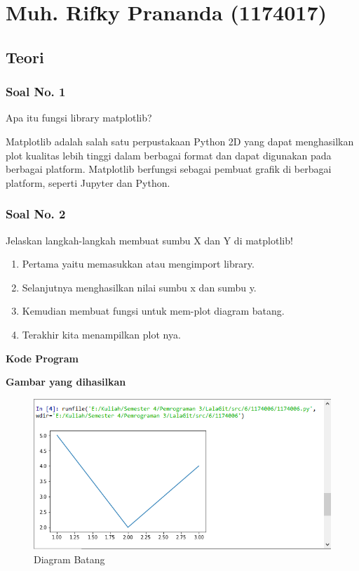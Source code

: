 \section{Muh. Rifky Prananda (1174017)}
\subsection{Teori}
\subsubsection{Soal No. 1}
\hfill \break
Apa itu fungsi library matplotlib?

\hfill \break
Matplotlib adalah salah satu perpustakaan Python 2D yang dapat menghasilkan plot kualitas lebih tinggi dalam berbagai format dan dapat digunakan pada berbagai platform. Matplotlib berfungsi sebagai pembuat grafik di berbagai platform, seperti Jupyter dan Python.

\subsubsection{Soal No. 2}
\hfill \break
Jelaskan langkah-langkah membuat sumbu X dan Y di matplotlib!

\begin{enumerate}
	\item Pertama yaitu memasukkan atau mengimport library.	
	
	
	\item Selanjutnya menghasilkan nilai sumbu x dan sumbu y.	
	
	
	\item Kemudian membuat fungsi untuk mem-plot diagram batang.
		

	\item Terakhir kita menampilkan plot nya.
	
	
\end{enumerate}
\hfill \break
\textbf{Kode Program}



\hfill \break
\textbf{Gambar yang dihasilkan}

\begin{figure}[H]
	\includegraphics[width=12cm]{figures/6/1174017/2.png}
	\centering
	\caption{Diagram Batang}
\end{figure}
 
